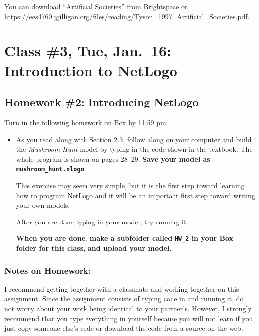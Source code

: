 \documentclass[]{article}
\begin{document}
You can download
``\href{/files/reading/Tyson_1997_Artificial_Societies.pdf}{Artificial
Societies}'' from Brightspace or
\url{https://ees4760.jgilligan.org/files/reading/Tyson_1997_Artificial_Societies.pdf}.

\hypertarget{class-3-tue-jan.16-introduction-to-netlogo}{%
\section{Class \#3, Tue, Jan.~16: Introduction to
NetLogo}\label{class-3-tue-jan.16-introduction-to-netlogo}}

\hypertarget{homework-2-introducing-netlogo}{%
\subsection{Homework \#2: Introducing
NetLogo}\label{homework-2-introducing-netlogo}}

Turn in the following homework on Box by 11:59 pm:

\begin{itemize}
\item
  As you read along with Section 2.3, follow along on your computer and
  build the \emph{Mushroom Hunt} model by typing in the code shown in
  the textbook. The whole program is shown on pages 28--29. \textbf{Save
  your model as \texttt{mushroom\_hunt.nlogo}}.

  This exercise may seem very simple, but it is the first step toward
  learning how to program NetLogo and it will be an important first step
  toward writing your own models.

  After you are done typing in your model, try running it.

  \textbf{When you are done, make a subfolder called \texttt{HW\_2} in
  your Box folder for this class, and upload your model.}
\end{itemize}

\hypertarget{notes-on-homework}{%
\subsubsection{Notes on Homework:}\label{notes-on-homework}}

I recommend getting together with a classmate and working together on
this assignment. Since the assignment consists of typing code in and
running it, do not worry about your work being identical to your
partner's. However, I strongly recommend that you type everything in
yourself because you will not learn if you just copy someone else's code
or download the code from a source on the web.
\end{document}
